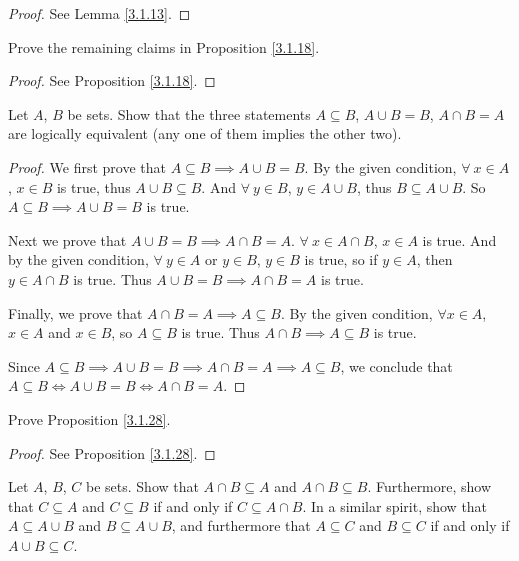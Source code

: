 \begin{proof}
See Lemma \ref{3.1.13}.
\end{proof}

\begin{exercise}\label{ex 3.1.4}
Prove the remaining claims in Proposition \ref{3.1.18}.
\end{exercise}

\begin{proof}
See Proposition \ref{3.1.18}.
\end{proof}


\begin{exercise}\label{ex 3.1.5}
Let \(A\), \(B\) be sets.
Show that the three statements \(A \subseteq B\), \(A \cup B = B\), \(A \cap B = A\) are logically equivalent (any one of them implies the other two).
\end{exercise}

\begin{proof}
We first prove that \(A \subseteq B \implies A \cup B = B\).
By the given condition, \(\forall\ x \in A\), \(x \in B\) is true, thus \(A \cup B \subseteq B\).
And \(\forall\ y \in B\), \(y \in A \cup B\), thus \(B \subseteq A \cup B\).
So \(A \subseteq B \implies A \cup B = B\) is true.

Next we prove that \(A \cup B = B \implies A \cap B = A\).
\(\forall\ x \in A \cap B\), \(x \in A\) is true.
And by the given condition, \(\forall\ y \in A\) or \(y \in B\), \(y \in B\) is true, so if \(y \in A\), then \(y \in A \cap B\) is true.
Thus \(A \cup B = B \implies A \cap B = A\) is true.

Finally, we prove that \(A \cap B = A \implies A \subseteq B\).
By the given condition, \(\forall x \in A\), \(x \in A\) and \(x \in B\), so \(A \subseteq B\) is true.
Thus \(A \cap B \implies A \subseteq B\) is true.

Since \(A \subseteq B \implies A \cup B = B \implies A \cap B = A \implies A \subseteq B\), we conclude that \(A \subseteq B \iff A \cup B = B \iff A \cap B = A\).
\end{proof}

\begin{exercise}\label{ex 3.1.6}
Prove Proposition \ref{3.1.28}.
\end{exercise}

\begin{proof}
See Proposition \ref{3.1.28}.
\end{proof}

\begin{exercise}\label{ex 3.1.7}
Let \(A\), \(B\), \(C\) be sets.
Show that \(A \cap B \subseteq A\) and \(A \cap B \subseteq B\).
Furthermore, show that \(C \subseteq A\) and \(C \subseteq B\) if and only if \(C \subseteq A \cap B\).
In a similar spirit, show that \(A \subseteq A \cup B\) and \(B \subseteq A \cup B\), and furthermore that \(A \subseteq C\) and \(B \subseteq C\) if and only if \(A \cup B \subseteq C\).
\end{exercise}

